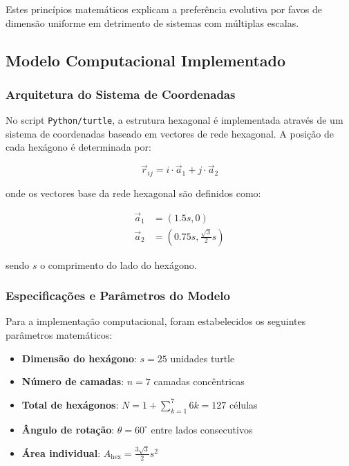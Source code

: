 \documentclass[12pt,a4paper,oneside]{extarticle}
\begin{document}
Estes princípios matemáticos explicam a preferência evolutiva por favos de dimensão uniforme em detrimento de sistemas com múltiplas escalas.

\subsection{Modelo Computacional Implementado}

\subsubsection{Arquitetura do Sistema de Coordenadas}
No script \texttt{Python/turtle}, a estrutura hexagonal é implementada através de um sistema de coordenadas baseado em vectores de rede hexagonal. A posição de cada hexágono é determinada por:

\begin{equation}
\vec{r}_{ij} = i \cdot \vec{a}_1 + j \cdot \vec{a}_2
\label{eq:hexagonal_grid}
\end{equation}

onde os vectores base da rede hexagonal são definidos como:

\begin{align}
\vec{a}_1 &= \left(1.5s, 0\right) \\
\vec{a}_2 &= \left(0.75s, \frac{\sqrt{3}}{2}s\right)
\label{eq:base_vectors}
\end{align}

sendo $s$ o comprimento do lado do hexágono.

\subsubsection{Especificações e Parâmetros do Modelo}
Para a implementação computacional, foram estabelecidos os seguintes parâmetros matemáticos:

\begin{itemize}
    \item \textbf{Dimensão do hexágono}: $s = 25$ unidades turtle
    \item \textbf{Número de camadas}: $n = 7$ camadas concêntricas
    \item \textbf{Total de hexágonos}: $N = 1 + \sum_{k=1}^{7} 6k = 127$ células
    \item \textbf{Ângulo de rotação}: $\theta = 60^\circ$ entre lados consecutivos
    \item \textbf{Área individual}: $A_{\text{hex}} = \frac{3\sqrt{3}}{2}s^2$
\end{itemize}
\end{document}
